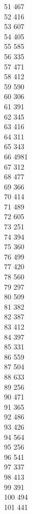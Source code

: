 { 51	467 \\
 52	416 \\
 53	607 \\
 54	405 \\
 55	585 \\
 56	335 \\
 57	471 \\
 58	412 \\
 59	590 \\
 60	306 \\
 61	391 \\
 62	345 \\
 63	416 \\
 64	311 \\
 65	343 \\
 66	4981 \\
 67	312 \\
 68	477 \\
 69	366 \\
 70	414 \\
 71	489 \\
 72	605 \\
 73	251 \\
 74	394 \\
 75	360 \\
 76	499 \\
 77	420 \\
 78	560 \\
 79	297 \\
 80	509 \\
 81	382 \\
 82	387 \\
 83	412 \\
 84	397 \\
 85	331 \\
 86	559 \\
 87	504 \\
 88	633 \\
 89	256 \\
 90	471 \\
 91	365 \\
 92	486 \\
 93	426 \\
 94	564 \\
 95	256 \\
 96	541 \\
 97	337 \\
 98	413 \\
 99	391 \\
 100	494 \\
 101	441 \\
}
